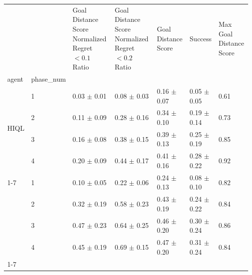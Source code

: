 \begin{tabular}{lllllll}
\toprule
 &  & Goal Distance Score Normalized Regret $< 0.1$ Ratio & Goal Distance Score Normalized Regret $< 0.2$ Ratio & Goal Distance Score & Success & Max Goal Distance Score \\
agent & phase_num &  &  &  &  &  \\
\midrule
\multirow[t]{4}{*}{HIQL} & 1 & 0.03 $\pm$ 0.01 & 0.08 $\pm$ 0.03 & 0.16 $\pm$ 0.07 & 0.05 $\pm$ 0.05 & 0.61 \\
 & 2 & 0.11 $\pm$ 0.09 & 0.28 $\pm$ 0.16 & 0.34 $\pm$ 0.10 & 0.19 $\pm$ 0.14 & 0.73 \\
 & 3 & 0.16 $\pm$ 0.08 & 0.38 $\pm$ 0.15 & 0.39 $\pm$ 0.13 & 0.25 $\pm$ 0.19 & 0.85 \\
 & 4 & 0.20 $\pm$ 0.09 & 0.44 $\pm$ 0.17 & 0.41 $\pm$ 0.16 & 0.28 $\pm$ 0.22 & 0.92 \\
\cline{1-7}
\multirow[t]{4}{*}{QRL} & 1 & 0.10 $\pm$ 0.05 & 0.22 $\pm$ 0.06 & 0.24 $\pm$ 0.13 & 0.08 $\pm$ 0.10 & 0.82 \\
 & 2 & 0.32 $\pm$ 0.19 & 0.58 $\pm$ 0.23 & 0.43 $\pm$ 0.19 & 0.24 $\pm$ 0.22 & 0.84 \\
 & 3 & 0.47 $\pm$ 0.23 & 0.64 $\pm$ 0.25 & 0.46 $\pm$ 0.20 & 0.30 $\pm$ 0.24 & 0.86 \\
 & 4 & 0.45 $\pm$ 0.19 & 0.69 $\pm$ 0.15 & 0.47 $\pm$ 0.20 & 0.31 $\pm$ 0.24 & 0.84 \\
\cline{1-7}
\bottomrule
\end{tabular}
